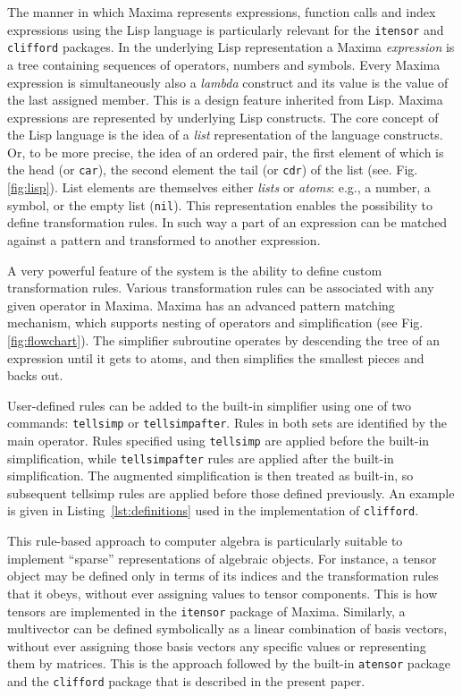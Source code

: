 \documentclass[twoside,reqno,11pt]{amsart}
\theoremstyle{definition}
\theoremstyle{remark}
\numberwithin{equation}{section}
\newcommand{\symb}[1]{{\tt #1}}
\begin{document}
The manner in which Maxima represents expressions, function calls and index expressions using the Lisp language is particularly relevant for the \symb{itensor} and \symb{clifford} packages. In the underlying Lisp representation a Maxima \textit{expression} is a tree containing sequences of operators, numbers and symbols. Every Maxima expression is simultaneously also a \textit{lambda} construct and its value is the value of the last assigned member. This is a design feature inherited from Lisp. Maxima expressions are represented by underlying Lisp constructs. The core concept of the Lisp language is  the idea of a  \textit{list} representation of the language constructs. Or, to be more precise, the idea of an ordered pair, the first element of which is the head (or {\tt car}), the second element the tail (or \symb{cdr}) of the list  (see. Fig. \ref{fig:lisp}). List elements are themselves either \textit{lists} or   \textit{atoms}: e.g., a number, a symbol, or the empty list (\symb{nil}). This representation enables the possibility to define transformation rules. In such way a part of an expression can be matched against a pattern and transformed to another expression.

A very powerful feature of the system is the ability to define custom transformation rules. Various transformation rules can be associated with any given operator in Maxima. Maxima has an advanced pattern matching mechanism, which supports nesting of operators and simplification (see Fig. \ref{fig:flowchart}). The simplifier subroutine operates by descending the tree of an expression until it gets to atoms, and then simplifies the smallest pieces and backs out.

User-defined rules can be added to the built-in simplifier using one of two  commands: \symb{tellsimp} or \symb{tellsimpafter}. Rules in both sets are identified by the main operator. Rules specified using \symb{tellsimp} are applied  before the built-in simplification, while \symb{tellsimpafter} rules are applied after the built-in simplification.
The augmented simplification is then treated as built-in, so subsequent tellsimp rules are applied before those defined previously.
An example is given in Listing~\ref{lst:definitions} used in the implementation of \symb{clifford}.

This rule-based approach to computer algebra is particularly suitable to implement ``sparse'' representations of algebraic objects. For instance, a tensor object may be defined only in terms of its indices and the transformation rules that it obeys, without ever assigning values to tensor components. This is how tensors are implemented in the \symb{itensor} package of Maxima. Similarly, a multivector can be defined symbolically as a linear combination of basis vectors, without ever assigning those basis vectors any specific values or representing them by matrices.
This is the approach followed by the built-in \symb{atensor} package and the \symb{clifford} package that is described in the present paper.
\end{document}
